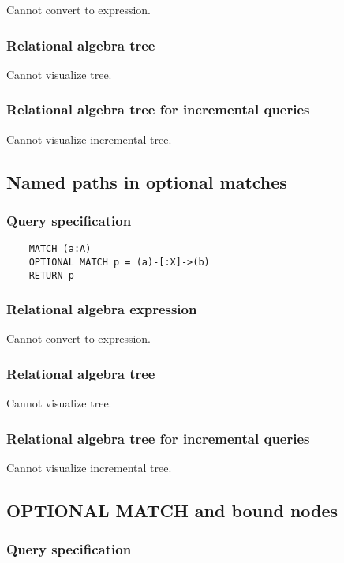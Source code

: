 	Cannot convert to expression.

	\subsubsection*{Relational algebra tree}

	Cannot visualize tree.

	\subsubsection*{Relational algebra tree for incremental queries}

	Cannot visualize incremental tree.
	\subsection{Named paths in optional matches}

	\subsubsection*{Query specification}

	\begin{lstlisting}
	MATCH (a:A)
	OPTIONAL MATCH p = (a)-[:X]->(b)
	RETURN p
	\end{lstlisting}


	\subsubsection*{Relational algebra expression}

	Cannot convert to expression.

	\subsubsection*{Relational algebra tree}

	Cannot visualize tree.

	\subsubsection*{Relational algebra tree for incremental queries}

	Cannot visualize incremental tree.
	\subsection{OPTIONAL MATCH and bound nodes}

	\subsubsection*{Query specification}


